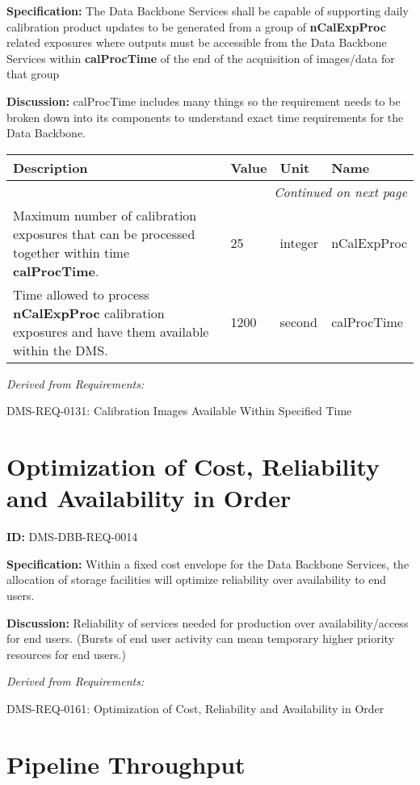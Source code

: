 \documentclass[SE,toc,lsstdraft]{lsstdoc}
\makeatletter
\newcommand{\paramname}[1]{\hspace{0pt}#1}
\newcommand{\unitname}[1]{\hspace{0pt}#1}
\newenvironment{parameters}[0]{%
\setlength\LTleft{0pt}
\setlength\LTright{\fill}
\begin{small}
\begin{longtable}[]{|p{0.49\textwidth}|l|p{0.6in}|p{1.70in}@{}|}

\hline \textbf{Description} & \textbf{Value} & \textbf{Unit} & \textbf{Name} \\ \hline
\endhead

\hline \multicolumn{4}{r}{\emph{Continued on next page}} \\
\endfoot

\hline\hline
\endlastfoot
}{%
\hline
\end{longtable}
\end{small}
}
\makeatother
\begin{document}
\textbf{Specification:}
The Data Backbone Services shall be capable of supporting daily calibration product updates to be generated from a group of \textbf{nCalExpProc} related exposures where outputs must be accessible from the Data Backbone Services within \textbf{calProcTime} of the end of the acquisition of images/data for that group

\textbf{Discussion:}
calProcTime includes many things so the requirement needs to be broken down into its components to understand exact time requirements for the Data Backbone.

\begin{parameters}

Maximum number of calibration exposures that can be processed together within time \textbf{calProcTime}.

&
25
&
\unitname{%
integer
}
&
\paramname{%
nCalExpProc
} \\\hline
Time allowed to process \textbf{nCalExpProc} calibration exposures and have them available within the DMS.
&
1200
&
\unitname{%
second
}
&
\paramname{%
calProcTime
} \\\hline
\end{parameters}

\emph{Derived from Requirements:}

DMS-REQ-0131:
Calibration Images Available Within Specified Time \newline

\section{Optimization of Cost, Reliability and Availability in Order}

\label{DMS-DBB-REQ-0014}
\textbf{ID:} DMS-DBB-REQ-0014

\textbf{Specification:}
Within a fixed cost envelope for the Data Backbone Services, the allocation of storage facilities will optimize reliability over availability to end users.

\textbf{Discussion:}
Reliability of services needed for production over availability/access for end users. (Bursts of end user activity can mean temporary higher priority resources for end users.)

\emph{Derived from Requirements:}

DMS-REQ-0161:
Optimization of Cost, Reliability and Availability in Order \newline

\section{Pipeline Throughput}
\end{document}

